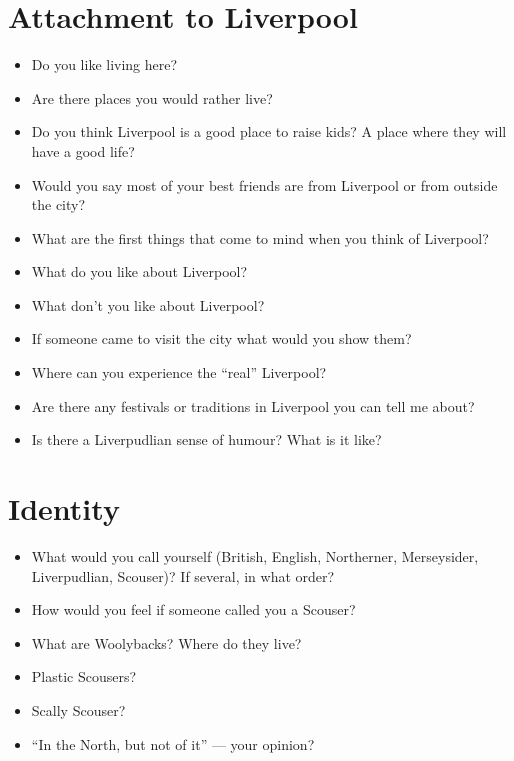 	\section*{Attachment to Liverpool}
	\begin{multicols}{2}
		\begin{itemize}
			\item Do you like living here?
			\item Are there places you would rather live?
			\item Do you think Liverpool is a good place to raise kids? A place where they will have a good life?
			\item Would you say most of your best friends are from Liverpool or from outside the city?
			\item What are the first things that come to mind when you think of Liverpool?
			\item What do you like about Liverpool?
			\item What don't you like about Liverpool?
			\item If someone came to visit the city what would you show them?
			\item Where can you experience the \enquote{real} Liverpool?
			\item Are there any festivals or traditions in Liverpool you can tell me about?
			\item Is there a Liverpudlian sense of humour? What is it like?
		\end{itemize}
	\end{multicols}
	
	\section*{Identity}
	\begin{multicols}{2}
		\begin{itemize}
			\item What would you call yourself (British, English, Northerner, Merseysider, Liverpudlian, Scouser)? If several, in what order?
			\item How would you feel if someone called you a Scouser?
			\item What are Woolybacks? Where do they live?
			\item Plastic Scousers?
			\item Scally Scouser?
			\item ``In the North, but not of it'' --- your opinion?
		\end{itemize}
	\end{multicols}
	

